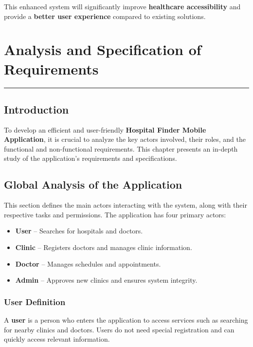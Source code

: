 \documentclass[12pt]{report}
\begin{document}
\noindent This enhanced system will significantly improve \textbf{healthcare accessibility} and provide a \textbf{better user experience} compared to existing solutions.











\newpage

\chapter{\textbf{Analysis and Specification of Requirements}}
\rule{\linewidth}{1.5pt}  %

\section{\textbf{Introduction}}

\noindent To develop an efficient and user-friendly \textbf{Hospital Finder Mobile Application}, it is crucial to analyze the key actors involved, their roles, and the functional and non-functional requirements. This chapter presents an in-depth study of the application’s requirements and specifications.

\section{\textbf{Global Analysis of the Application}}

\noindent This section defines the main actors interacting with the system, along with their respective tasks and permissions. The application has four primary actors:
\begin{itemize}
	\item \textbf{User} – Searches for hospitals and doctors.
	\item \textbf{Clinic} – Registers doctors and manages clinic information.
	\item \textbf{Doctor} – Manages schedules and appointments.
	\item \textbf{Admin} – Approves new clinics and ensures system integrity.
\end{itemize}

\subsection{\textbf{User Definition}}
\noindent A \textbf{user} is a person who enters the application to access services such as searching for nearby clinics and doctors. Users do not need special registration and can quickly access relevant information.
\end{document}
